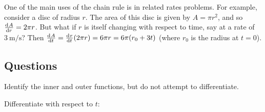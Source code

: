 \begin{ex}
  One of the main uses of the chain rule is in related rates problems. For example, consider
  a disc of radius $ r $. The area of this disc is given by $ A = \pi r^2 $, and so $ \od{A}{r} = 2\pi r $.
  But what if $ r $ is itself changing with respect to time, say at a rate of $ \SI{3}{\metre\per\second} $? Then
  $ \od{A}{t} = \od{r}{t} (2\pi r) = 6\pi r = 6\pi (r_0 + 3t) $ (where $ r_0 $ is the radius at $ t = 0 $).
\end{ex}

\clearpage
\subsection*{Questions}
\begin{questions}
   \questioA Identify the inner and outer functions, but do not attempt to differentiate.
   \questioA Differentiate with respect to $ t $:
\end{questions}
